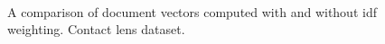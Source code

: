 \begin{figure}[h!]
    \centering
    \\
    \caption{A comparison of document vectors computed with and without \gls{idf} weighting. Contact lens dataset.}
    \label{fig:weighted_vs_average_contact_lens}
\end{figure}

